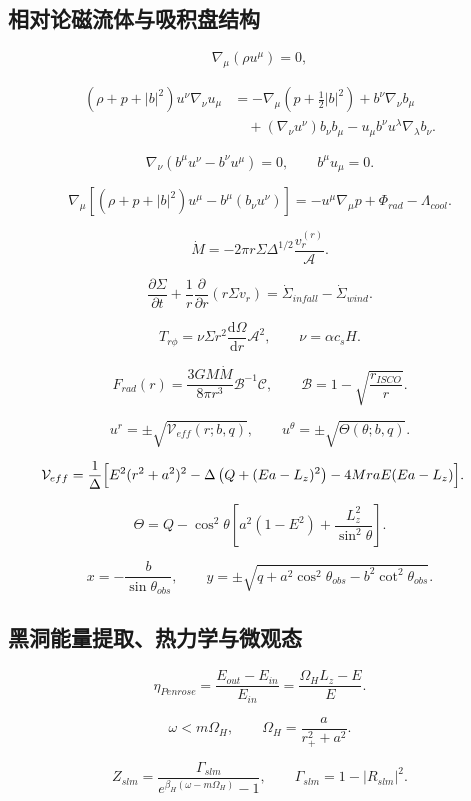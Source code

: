 \documentclass[UTF8,11pt,a4paper]{ctexart}
\newcommand{\A}{\mathcal{A}}
\newcommand{\B}{\mathcal{B}}
\newcommand{\C}{\mathcal{C}}
\newcommand{\V}{\mathcal{V}}
\newcommand{\dd}{\mathrm{d}}
\begin{document}
\subsection{相对论磁流体与吸积盘结构}

\[
\nabla_\mu(\rho u^\mu)=0,
\]

\begin{align*}
(\rho+p+|b|^2)u^\nu\nabla_\nu u_\mu
&=-\nabla_\mu\left(p+\frac12|b|^2\right)+b^\nu\nabla_\nu b_\mu\\
&\quad+(\nabla_\nu u^\nu)b_\nu b_\mu
-u_\mu b^\nu u^\lambda\nabla_\lambda b_\nu .
\end{align*}

\[
\nabla_\nu\left(b^\mu u^\nu-b^\nu u^\mu\right)=0,\qquad
b^\mu u_\mu=0.
\]

\[
\nabla_\mu\left[(\rho+p+|b|^2)u^\mu-b^\mu(b_\nu u^\nu)\right]
=-u^\mu\nabla_\mu p+\Phi_{rad}-\Lambda_{cool}.
\]

\[
\dot M=-2\pi r\Sigma\Delta^{1/2}\frac{v_r^{(r)}}{\A}.
\]

\[
\frac{\partial\Sigma}{\partial t}
+\frac1r\frac{\partial}{\partial r}\left(r\Sigma v_r\right)
=\dot\Sigma_{infall}-\dot\Sigma_{wind}.
\]

\[
T_{r\phi}=\nu\Sigma r^2\frac{\dd\Omega}{\dd r}\A^2,
\qquad
\nu=\alpha c_sH.
\]

\[
F_{rad}(r)=\frac{3GM\dot M}{8\pi r^3}\B^{-1}\C,
\qquad
\B=1-\sqrt{\frac{r_{ISCO}}{r}}.
\]

\[
u^r=\pm\sqrt{\V_{eff}(r;b,q)},\qquad
u^\theta=\pm\sqrt{\Theta(\theta;b,q)}.
\]

\begin{align*}
\V_{eff}
&=\frac{1}{\Delta}\Bigl[E^2(r^2+a^2)^2
-\Delta\left(Q+(Ea-L_z)^2\right)
-4MraE(Ea-L_z)\Bigr].
\end{align*}

\[
\Theta=Q-\cos^2\theta\left[a^2(1-E^2)
+\frac{L_z^2}{\sin^2\theta}\right].
\]

\[
x=-\frac{b}{\sin\theta_{obs}},\qquad
y=\pm\sqrt{q+a^2\cos^2\theta_{obs}
-b^2\cot^2\theta_{obs}}.
\]

\subsection{黑洞能量提取、热力学与微观态}

\[
\eta_{Penrose}=\frac{E_{out}-E_{in}}{E_{in}}
=\frac{\Omega_HL_z-E}{E}.
\]

\[
\omega<m\Omega_H,\qquad
\Omega_H=\frac{a}{r_+^2+a^2}.
\]

\[
Z_{slm}=\frac{\Gamma_{slm}}{e^{\beta_H(\omega-m\Omega_H)}-1},
\qquad
\Gamma_{slm}=1-|R_{slm}|^2.
\]
\end{document}
